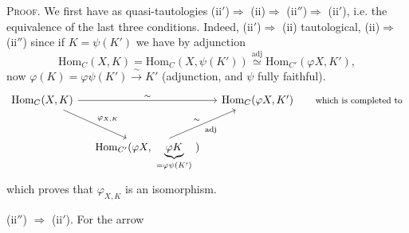 \documentclass[11pt]{article}
\newcommand{\msp}[1]{\marginpar{\footnotesize [#1]}}
\begin{document}
\textsc{Proof.} We first have as quasi-tautologies (ii$'$)$\Longrightarrow$ (ii)$\Longrightarrow$ (ii$''$)$\Longrightarrow$ (ii$'$), i.e. the equivalence of the last three conditions. Indeed, (ii$'$)$\Longrightarrow$ (ii) tautological, (ii)$\Longrightarrow$ (ii$''$) since if $K=\psi(K')$ we have %
\msp{page 38}
by adjunction
\[
\mathrm{Hom}_C(X,K)=\mathrm{Hom}_C(X,\psi(K'))\overset{\text{adj}}{\simeq}\mathrm{Hom}_{C'}(\varphi X,K'),
\]
now $\varphi(K)=\varphi\psi(K')\xrightarrow{\ \sim\ }K'$ (adjunction, and $\psi$ fully faithful).
\[
\begin{tikzcd}[column sep=small, row sep=large]
\mathrm{Hom}_C(X,K) \arrow[rr, "\sim"] \arrow[dr, "\varphi_{X,K}"] & & \mathrm{Hom}_C(\varphi X,K') & \text{\footnotesize which is completed to} \\ %
& \mathrm{Hom}_{C'}(\varphi X,\ \underbrace{\varphi K}_{=\varphi\psi(K')}\ ) \arrow[ur, "\sim", "\text{adj}"'] & &
\end{tikzcd}
\]
which proves that $\varphi_{X,K}$ is an isomorphism.

(ii$''$) $\Longrightarrow$ (ii$'$). For the arrow
\end{document}
